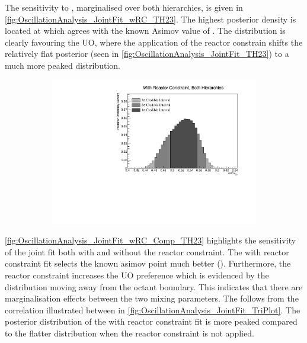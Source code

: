 The sensitivity to \sinsqatm, marginalised over both hierarchies, is given in \autoref{fig:OscillationAnalysis_JointFit_wRC_TH23}. The highest posterior density is located at  which agrees with the known Asimov value of . The distribution is clearly favouring the UO, where the application of the reactor constrain shifts the relatively flat posterior (seen in \autoref{fig:OscillationAnalysis_JointFit_TH23}) to a much more peaked distribution.

\begin{figure}[h]
  \begin{subfigure}[t]{1.0\textwidth}
    \includegraphics[width=\textwidth, trim={0mm 0mm 0mm 0mm}, clip,page=1]{Figures/OA/JointFit_wRC/Contours_1D_th23_BH_1_wRC_UnSmeared_CredibleInterval.pdf}
  \end{subfigure}
  \caption{}
  \label{fig:OscillationAnalysis_JointFit_wRC_TH23}
\end{figure}

\autoref{fig:OscillationAnalysis_JointFit_wRC_Comp_TH23} highlights the sensitivity of the joint fit both with and without the reactor constraint. The with reactor constraint fit selects the known asimov point much better (). Furthermore, the reactor constraint increases the UO preference which is evidenced by the distribution moving away from the octant boundary. This indicates that there are marginalisation effects between the two mixing parameters. The follows from the correlation illustrated between  in \autoref{fig:OscillationAnalysis_JointFit_TriPlot}. The posterior distribution of the with reactor constraint fit is more peaked compared to the flatter distribution when the reactor constraint is not applied. 

